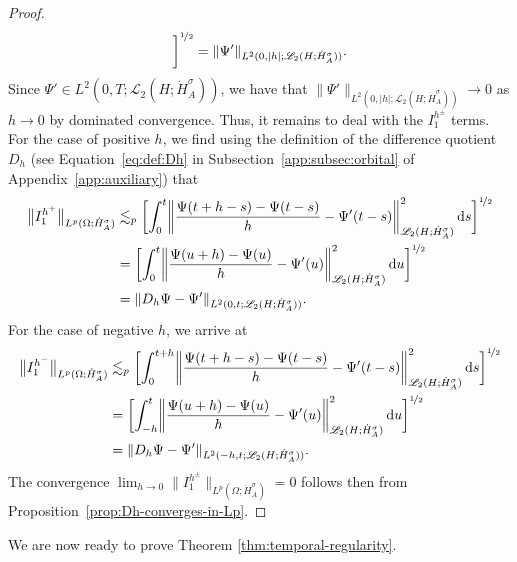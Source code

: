 \documentclass[reqno]{amsart}
\numberwithin{equation}{section}
\newcommand{\norm}[2]{     \| #1       \|_{ #2 }}
\newcommand{\rd}{\mathop{}\!\mathrm{d}}
\newcommand{\Hdot}[1]{\dot{H}^{#1}_A}
\theoremstyle{remark}
\theoremstyle{definition}
\begin{document}
\begin{proof}
\begin{align*}
	\biggr]^{\nicefrac{1}{2}} 
	= 
	\norm{\Psi'}{L^2(0,|h|;\mathscr L_2(H; \Hdot{\sigma}))}.
	\end{align*}
	Since $\Psi' \in L^2(0,T; \mathscr L_2(H; \Hdot{\sigma}))$, 
	we have that $\norm{\Psi'}{L^2(0,|h|;\mathscr L_2(H; \Hdot{\sigma}))} \to 0$ 
	as $h \to 0$ by dominated convergence. 
	Thus, it remains to deal with the $I_1^{h^\pm}$ terms. 
	For the case of positive $h$, we find 
	using the definition of the difference quotient $D_h$ 
	(see Equation~\eqref{eq:def:Dh} in Subsection~\ref{app:subsec:orbital} 
	of Appendix~\ref{app:auxiliary}) 
	that 
	\begin{align*} 
	\bigl\| I_1^{h^+} \bigr\|_{L^p(\Omega;\Hdot \sigma)} 
	&\lesssim_p 
	\biggl[ \int_0^t 
	\biggl\| \frac{\Psi(t+h-s) - \Psi(t-s)}{h} - \Psi'(t-s) 
	\biggr\|_{\mathscr L_2(H; \Hdot{\sigma})}^2 
	\rd s\biggr]^{\nicefrac{1}{2}} 
	\\
	&= \biggl[\int_0^t 
	\biggl\| \frac{\Psi(u+h) - \Psi(u)}{h} - \Psi'(u) 
	\biggr\|_{\mathscr L_2(H; \Hdot{\sigma})}^2 \rd u \biggr]^{\nicefrac{1}{2}} 
	\\
	&= \norm{D_h \Psi - \Psi'}{L^2(0,t; \mathscr L_2(H; \Hdot{\sigma}))}.
	\end{align*} 
	For the case of negative $h$, we arrive at
	\begin{align*}
	\bigl\| I_1^{h^-}\bigr\|_{L^p(\Omega;\Hdot \sigma)} 
	&\lesssim_p 
	\biggl[\int_0^{t+h} 
	\biggl\| \frac{\Psi(t+h-s) - \Psi(t-s)}{h} - \Psi'(t-s) 
	\biggr\|_{\mathscr L_2(H; \Hdot{\sigma})}^2\rd s \biggr]^{\nicefrac{1}{2}} 
	\\
	&= \biggl[\int_{-h}^t 
	\biggl\| \frac{\Psi(u+h) - \Psi(u)}{h} - \Psi'(u) 
	\biggr\|_{\mathscr L_2(H; \Hdot{\sigma})}^2\rd u \biggr]^{\nicefrac{1}{2}} 
	\\
	&= \norm{D_h \Psi - \Psi'}{L^2(-h,t; \mathscr L_2(H; \Hdot{\sigma}))}.
	\end{align*}
	The convergence 
	$\lim_{h\to 0}\norm{I_1^{h^\pm}}{L^p(\Omega;\Hdot \sigma)}=0$ 
	follows then from Proposition~\ref{prop:Dh-converges-in-Lp}. 
\end{proof}

We are now ready to prove Theorem \ref{thm:temporal-regularity}.
\end{document}
